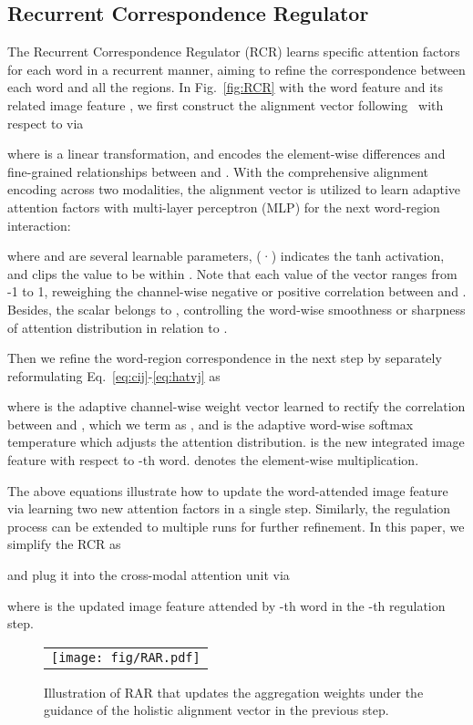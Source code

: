 \documentclass[journal]{IEEEtran}\newcommand{\ignore}[1]{}
\begin{document}
\subsection{Recurrent Correspondence Regulator} 
The Recurrent Correspondence Regulator (RCR) learns specific attention factors for each word in a recurrent manner, aiming to refine the correspondence between each word and all the regions. In Fig.~\ref{fig:RCR} with the word feature  and its related image feature , we first construct the alignment vector  following~\cite{GRN19} with respect to  via

where  is a linear transformation, and  encodes the element-wise differences and fine-grained relationships between  and . With the comprehensive alignment encoding across two modalities, the alignment vector  is utilized to learn adaptive attention factors with multi-layer perceptron (MLP) for the next word-region interaction:

where  and  are several learnable parameters, (·) indicates the tanh activation, and  clips the value  to be within . Note that each value of the vector  ranges from -1 to 1, reweighing the channel-wise negative or positive correlation between  and . Besides, the scalar  belongs to , controlling the word-wise smoothness or sharpness of attention distribution in relation to .


Then we refine the word-region correspondence in the next step by separately reformulating Eq.~\eqref{eq:cij}-\eqref{eq:hatvj} as







where  is the adaptive channel-wise weight vector learned to rectify the correlation between  and , which we term as , and  is the adaptive word-wise softmax temperature which adjusts the attention distribution.  is the new integrated image feature with respect to -th word.  denotes the element-wise multiplication. 

The above equations illustrate how to update the word-attended image feature via learning two new attention factors in a single step. Similarly, the regulation process can be extended to multiple runs for further refinement.
In this paper, we simplify the RCR as 

and plug it into the cross-modal attention unit via

where  is the updated image feature attended by -th word in the -th regulation step.

\begin{figure}[t!]
	\centering
	\begin{tabular}{@{}c}
		\texttt{[image: fig/RAR.pdf]} 
	\end{tabular}
	\caption{Illustration of RAR that updates the aggregation weights under the guidance of the holistic alignment vector in the previous step.}
	\label{fig:RAR}
\end{figure}
\end{document}
